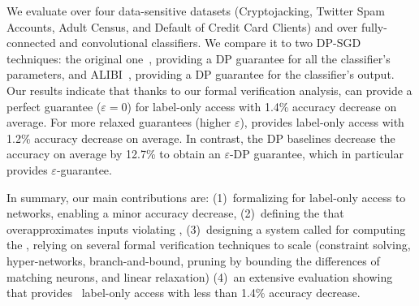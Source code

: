We evaluate \tool over four data-sensitive datasets (Cryptojacking, Twitter Spam Accounts, Adult Census, and Default of Credit Card Clients) and over fully-connected and convolutional classifiers. %
We compare it to two DP-SGD techniques: the original one~\cite{ref_22}, providing a DP guarantee for all the classifier's parameters, and 
ALIBI~\cite{ref_58}, providing a DP guarantee for the classifier's output. 
Our results indicate that thanks to our formal verification analysis, \tool can provide a perfect \propi guarantee ($\varepsilon=0$) for label-only access with 1.4\% accuracy decrease on average. 
For more relaxed \propi guarantees (higher $\varepsilon$), \tool provides \propi label-only access with 1.2\% accuracy decrease on average. %
In contrast, the DP baselines decrease the accuracy on average by 12.7\% to obtain an $\varepsilon$-DP guarantee, which in particular provides $\varepsilon$-\propi guarantee. 

In summary, our main contributions are: (1)~formalizing \propi for label-only access to networks, enabling a minor accuracy decrease, (2)~defining the \propa that overapproximates inputs violating \propi, (3)~designing a system called \tool for computing the \propa, relying on several formal verification techniques to scale (constraint solving, hyper-networks, branch-and-bound, 
pruning by bounding the differences of matching neurons, and linear relaxation) (4)~an extensive evaluation showing that \tool provides ~\propi label-only access with less than 1.4\% accuracy decrease. 







